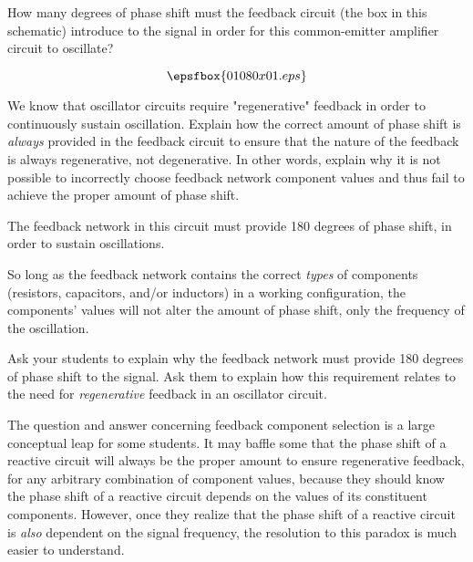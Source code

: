 

How many degrees of phase shift must the feedback circuit (the box in this schematic) introduce to the signal in order for this common-emitter amplifier circuit to oscillate?

$$\epsfbox{01080x01.eps}$$

We know that oscillator circuits require "regenerative" feedback in order to continuously sustain oscillation.  Explain how the correct amount of phase shift is {\it always} provided in the feedback circuit to ensure that the nature of the feedback is always regenerative, not degenerative.  In other words, explain why it is not possible to incorrectly choose feedback network component values and thus fail to achieve the proper amount of phase shift.







The feedback network in this circuit must provide 180 degrees of phase shift, in order to sustain oscillations.  

\vskip 10pt

So long as the feedback network contains the correct {\it types} of components (resistors, capacitors, and/or inductors) in a working configuration, the components' values will not alter the amount of phase shift, only the frequency of the oscillation.







Ask your students to explain why the feedback network must provide 180 degrees of phase shift to the signal.  Ask them to explain how this requirement relates to the need for {\it regenerative} feedback in an oscillator circuit.

The question and answer concerning feedback component selection is a large conceptual leap for some students.  It may baffle some that the phase shift of a reactive circuit will always be the proper amount to ensure regenerative feedback, for any arbitrary combination of component values, because they should know the phase shift of a reactive circuit depends on the values of its constituent components.  However, once they realize that the phase shift of a reactive circuit is {\it also} dependent on the signal frequency, the resolution to this paradox is much easier to understand.




